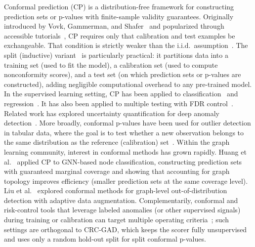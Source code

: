 \documentclass[a4paper]{cas-dc}
\theoremstyle{definition}
\begin{document}
Conformal prediction (CP) is a distribution-free framework for constructing prediction sets or p-values with finite-sample validity guarantees.  Originally introduced by Vovk, Gammerman, and Shafer~\cite{vovk2005algorithmic} and popularized through accessible tutorials~\cite{angelopoulos2023conformal,shafer2008tutorial}, CP requires only that calibration and test examples be exchangeable.
That condition is strictly weaker than the i.i.d.\ assumption~\cite{lei2013conformal}.  The split (inductive) variant~\cite{papadopoulos2002inductive,lei2018distribution} is particularly practical: it partitions data into a training set (used to fit the model), a calibration set (used to compute nonconformity scores), and a test set (on which prediction sets or p-values are constructed), adding negligible computational overhead to any pre-trained model.
In the supervised learning setting, CP has been applied to classification~\cite{romano2020classification} and regression~\cite{romano2019conformalized}.
It has also been applied to multiple testing with FDR control~\cite{bates2023testing,benjamini1995fdr}.
Related work has explored uncertainty quantification for deep anomaly detection~\cite{zhang2024eswauncertainty}.  More broadly, conformal p-values have been used for outlier detection in tabular data, where the goal is to test whether a new observation belongs to the same distribution as the reference (calibration) set~\cite{bates2023testing}.
Within the graph learning community, interest in conformal methods has grown rapidly.  Huang et al.~\cite{huang2024uncertainty} applied CP to GNN-based node classification, constructing prediction sets with guaranteed marginal coverage and showing that accounting for graph topology improves efficiency (smaller prediction sets at the same coverage level).  Liu et al.~\cite{liu2024conformal} explored conformal methods for graph-level out-of-distribution detection with adaptive data augmentation.  Complementarily, conformal and risk-control tools that leverage labeled anomalies (or other supervised signals) during training or calibration can target multiple operating criteria~\cite{bates2023testing}; such settings are orthogonal to CRC-GAD, which keeps the scorer fully unsupervised and uses only a random hold-out split for split conformal p-values.
\end{document}
